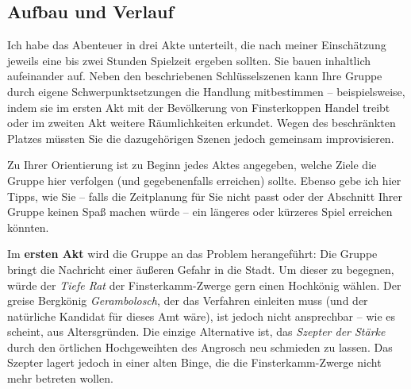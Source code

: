 \documentclass[openright]{Ilaris}
\begin{document}
\subsection{Aufbau und Verlauf}
Ich habe das Abenteuer in drei Akte unterteilt, die nach meiner Einschätzung jeweils eine bis zwei Stunden Spielzeit ergeben sollten.
Sie bauen inhaltlich aufeinander auf.
Neben den beschriebenen Schlüsselszenen kann Ihre Gruppe durch eigene Schwerpunktsetzungen die Handlung mitbestimmen -- beispielsweise,
indem sie im ersten Akt mit der Bevölkerung von Finsterkoppen Handel treibt oder im zweiten Akt weitere Räumlichkeiten erkundet.
Wegen des beschränkten Platzes müssten Sie die dazugehörigen Szenen jedoch gemeinsam improvisieren.

Zu Ihrer Orientierung ist zu Beginn jedes Aktes angegeben, welche Ziele die Gruppe hier verfolgen (und gegebenenfalls erreichen) sollte.
Ebenso gebe ich hier Tipps, wie Sie -- falls die Zeitplanung für Sie nicht passt  oder der Abschnitt Ihrer Gruppe keinen Spaß machen würde -- ein längeres oder kürzeres Spiel erreichen könnten.









Im \textbf{ersten Akt} wird die Gruppe an das Problem herangeführt:
Die Gruppe bringt die Nachricht einer äußeren Gefahr in die Stadt.
Um dieser zu begegnen, würde der \emph{Tiefe Rat} der Finsterkamm-Zwerge gern einen Hochkönig wählen.
Der greise Bergkönig \emph{Gerambolosch}, der das Verfahren einleiten muss (und der natürliche Kandidat für dieses Amt wäre), ist jedoch nicht ansprechbar -- wie es scheint, aus Altersgründen.
Die einzige Alternative ist, das \emph{Szepter der Stärke} durch den örtlichen Hochgeweihten des Angrosch neu schmieden zu lassen.
Das Szepter lagert jedoch in einer alten Binge, die die Finsterkamm-Zwerge nicht mehr betreten wollen.
\end{document}
